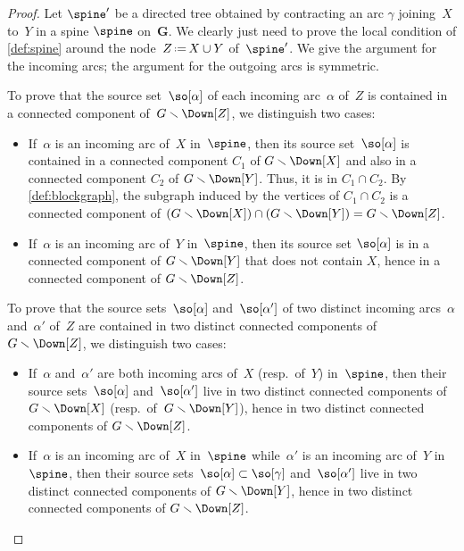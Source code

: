 \documentclass{amsart}
\theoremstyle{definition}
\renewcommand{\b}[1]{{\boldsymbol{#1}}} %
\newcommand{\ssm}{\smallsetminus} %
\newcommand{\eqdef}{\mbox{\,\raisebox{0.2ex}{\scriptsize\ensuremath{\mathrm:}}\ensuremath{=}\,}} %
\begin{document}
\begin{proof} 
  Let $\spine'$ be a directed tree obtained by contracting an arc $\gamma$ joining~$X$ to~$Y$ in a spine $\spine$ on~$\b{G}$.
  We clearly just need to prove the local condition of \cref{def:spine} around the node~$Z \eqdef X \cup Y$ of~$\spine'$.
  We give the argument for the incoming arcs; the argument for the outgoing arcs is symmetric. 

  To prove that the source set~$\so[\alpha]$ of each incoming arc~$\alpha$ of~$Z$ is contained in a connected component of~$G \ssm \Down[Z]$, we distinguish two cases:
  \begin{itemize}
    \item If~$\alpha$ is an incoming arc of~$X$ in~$\spine$, then its source set~$\so[\alpha]$ is contained in a connected component $C_1$ of $G \ssm \Down[X]$ and also in a connected component $C_2$ of $G \ssm \Down[Y]$. Thus, it is in $C_1 \cap C_2$. By \cref{def:blockgraph}, the subgraph induced by the vertices of $C_1 \cap C_2$ is a connected component of $(G \ssm \Down[X]) \cap (G \ssm \Down[Y]) = G \ssm \Down[Z]$.
    \item If~$\alpha$ is an incoming arc of~$Y$ in~$\spine$, then its source set $\so[\alpha]$ is in a connected component of $G \ssm \Down[Y]$ that does not contain $X$, hence in a connected component of $G \ssm \Down[Z]$.
  \end{itemize}

  To prove that the source sets~$\so[\alpha]$ and~$\so[\alpha']$ of two distinct incoming arcs~$\alpha$ and~$\alpha'$ of~$Z$ are contained in two distinct connected components of~$G \ssm \Down[Z]$, we distinguish two cases:
  \begin{itemize}
    \item If~$\alpha$ and~$\alpha'$ are both incoming arcs of~$X$ (resp.~of~$Y$) in~$\spine$, then their source sets~$\so[\alpha]$ and~$\so[\alpha']$ live in two distinct connected components of $G \ssm \Down[X]$ (resp.~of~$G \ssm \Down[Y]$), hence in two distinct connected components of $G\ssm \Down[Z]$.
    \item If~$\alpha$ is an incoming arc of~$X$ in~$\spine$ while~$\alpha'$ is an incoming arc of~$Y$ in~$\spine$, then their source sets~$\so[\alpha] \subset \so[\gamma]$ and~$\so[\alpha']$ live in two distinct connected components of $G \ssm \Down[Y]$, hence in two distinct connected components of $G \ssm \Down[Z]$.
    \qedhere
  \end{itemize}
\end{proof}
\end{document}
